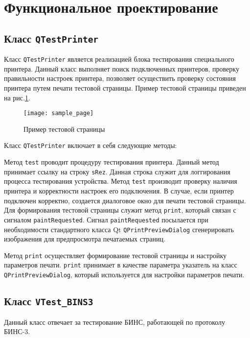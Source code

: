 \section{Функциональное проектирование}
\label{sec:func}

\subsection{Класс \texttt{QTestPrinter}}
Класс \texttt{QTestPrinter} является реализацией блока тестирования специального принтера.
Данный класс выполняет поиск подключенных принтеров, проверку правильности настроек принтера,
позволяет осуществить проверку состояния принтера путем печати тестовой страницы. Пример тестовой страницы приведен на
рис.\ref{fig:func:sample_page}.
\begin{figure}[!htb]
	\centering
	\texttt{[image: sample\_page]}
	\caption{Пример тестовой страницы}
	\label{fig:func:sample_page}
\end{figure}

Класс \texttt{QTestPrinter} включает в себя следующие методы:

\begin{enum}
	\item Метод \texttt{test} проводит процедуру тестирования принтера. Данный метод принимает ссылку на строку
		\texttt{sRez}. Данная строка служит для логгирования процесса тестирования устройства. Метод \texttt{test} производит
		проверку наличия принтера и корректности настроек его подключения. В случае, если принтер подключен корректно, создается
		диалоговое окно для печати тестовой страницы. Для формирования тестовой страницы служит метод \texttt{print}, который
		связан с сигналом \texttt{paintRequested}. Сигнал \texttt{paintRequested} посылается при необходимости стандартного
		класса Qt \texttt{QPrintPreviewDialog} сгенерировать изображения для предпросмотра печатаемых страниц.

	\item Метод \texttt{print} осуществляет формирование тестовой страницы и настройку параметров печати. \texttt{print}
		принимает в качестве параметра указатель на класс \texttt{QPrintPreviewDialog}, который используется для настройки
		параметров печати.
\end{enum}

\subsection{Класс \texttt{VTest\_BINS3}}
Данный класс отвечает за тестирование БИНС, работающей по протоколу БИНС-3.

